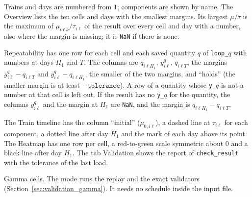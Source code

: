 Trains and days are numbered from $1$; components are shown by name. The Overview lists the ten cells and days with the smallest margins. Its largest $\mu/\tau$ is the maximum of $\mu_{i\ell k}/\tau_{i\ell}$ of the result over every cell and day with a number, also where the margin is missing; it is \texttt{NaN} if there is none.

Repeatability has one row for each cell and each saved quantity $q$ of \texttt{loop\_}$q$ with numbers at days $H_1$ and $T$. The columns are $q_{i\ell H_1}$, $y^q_{i\ell}$, $q_{i\ell T}$, the margins $y^q_{i\ell}-q_{i\ell T}$ and $y^q_{i\ell}-q_{i\ell H_1}$, the smaller of the two margins, and ``holds'' (the smaller margin is at least $-\texttt{tolerance}$). A row of a quantity whose \texttt{y\_}$q$ is not a number at that cell is left out. If the result has no \texttt{y\_}$q$ for the quantity, the columns $y^q_{i\ell}$ and the margin at $H_1$ are \texttt{NaN}, and the margin is $q_{i\ell H_1}-q_{i\ell T}$.

The Train timeline has the column ``initial'' ($\mu_{0,i\ell}$), a dashed line at $\tau_{i\ell}$ for each component, a dotted line after day $H_1$ and the mark of each day above its point. The Heatmap has one row per cell, a red-to-green scale symmetric about $0$ and a black line after day $H_1$. The tab Validation shows the report of \texttt{check\_result} with the tolerance of the last load.

Gamma cells. The mode runs the replay and the exact validators (Section~\ref{sec:validation_gamma}). It needs no schedule inside the input file.

